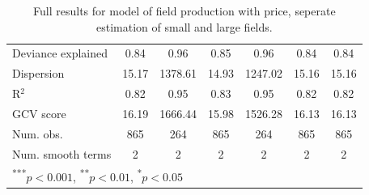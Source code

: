 \documentclass[12pt]{article}
\begin{document}
\begin{table}
\begin{center}
\begin{tabular}{l c c c c c c }
Deviance explained                   & 0.84          & 0.96          & 0.85          & 0.96          & 0.84          & 0.84          \\
Dispersion                           & 15.17         & 1378.61       & 14.93         & 1247.02       & 15.16         & 15.16         \\
R$^2$                                & 0.82          & 0.95          & 0.83          & 0.95          & 0.82          & 0.82          \\
GCV score                            & 16.19         & 1666.44       & 15.98         & 1526.28       & 16.13         & 16.13         \\
Num. obs.                            & 865           & 264           & 865           & 264           & 865           & 865           \\
Num. smooth terms                    & 2             & 2             & 2             & 2             & 2             & 2             \\
\hline
\multicolumn{7}{l}{\scriptsize{\textsuperscript{***}$p<0.001$, 
  \textsuperscript{**}$p<0.01$, 
  \textsuperscript{*}$p<0.05$}}
\end{tabular}
\caption{Full results for model of field production with price, seperate estimation of small and large fields.}
\label{table:unpooled}
\end{center}
\end{table}
\end{document}
